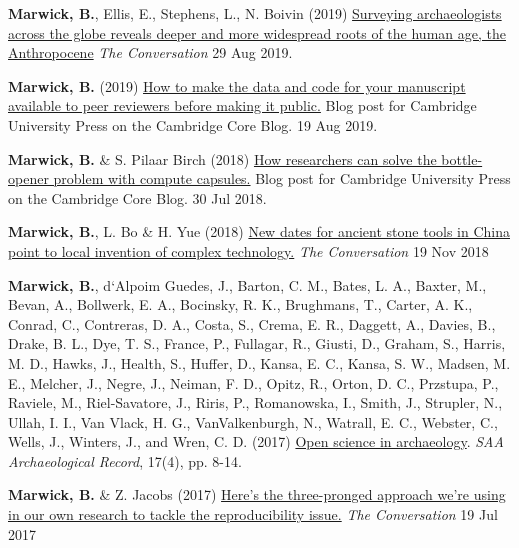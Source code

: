 \documentclass[11pt,article,oneside]{memoir}
\begin{document}
{{{\ind \textbf{Marwick, B.}, Ellis, E., Stephens, L., N. Boivin (2019) \href{https://theconversation.com/surveying-archaeologists-across-the-globe-reveals-deeper-and-more-widespread-roots-of-the-human-age-the-anthropocene-122008}{Surveying archaeologists across the globe reveals deeper and more widespread roots of the human age, the Anthropocene} \textit{The Conversation} 29 Aug 2019.

\ind \textbf{Marwick, B.} (2019) \href{https://www.cambridge.org/core/blog/2019/08/19/how-to-make-the-data-and-code-for-your-manuscript-available-to-peer-reviewers-before-making-it-public/}{How to make the data and code for your manuscript available to peer reviewers before making it public.} Blog post for Cambridge University Press on the Cambridge Core Blog. 19 Aug 2019.

\ind \textbf{Marwick, B.} \& S. Pilaar Birch (2018) \href{https://www.cambridge.org/core/blog/2018/07/30/how-researchers-can-solve-the-bottle-opener-problem-with-compute-capsules/}{How researchers can solve the bottle-opener problem with compute capsules.} Blog post for Cambridge University Press on the Cambridge Core Blog. 30 Jul 2018. 

\ind \textbf{Marwick, B.}, L. Bo \& H. Yue (2018) \href{https://theconversation.com/new-dates-for-ancient-stone-tools-in-china-point-to-local-invention-of-complex-technology-106914}{New dates for ancient stone tools in China point to local invention of complex technology.} \textit{The Conversation} 19 Nov 2018 

\ind \textbf{Marwick, B.}, d`Alpoim Guedes, J., Barton, C. M., Bates, L. A., Baxter, M., Bevan, A., Bollwerk, E. A., Bocinsky, R. K., Brughmans, T., Carter, A. K., Conrad, C., Contreras, D. A., Costa, S., Crema, E. R., Daggett, A., Davies, B., Drake, B. L., Dye, T. S., France, P., Fullagar, R., Giusti, D., Graham, S., Harris, M. D., Hawks, J., Health, S., Huffer, D., Kansa, E. C., Kansa, S. W., Madsen, M. E., Melcher, J., Negre, J., Neiman, F. D., Opitz, R., Orton, D. C., Przstupa, P., Raviele, M., Riel-Savatore, J., Riris, P., Romanowska, I., Smith, J., Strupler, N., Ullah, I. I., Van Vlack, H. G., VanValkenburgh, N., Watrall, E. C., Webster, C., Wells, J., Winters, J., and Wren, C. D. (2017) \href{http://www.saa.org/Portals/0/SAA\_Record\_Sept\_2017\_Final\_LR.pdf\#page\=10}{Open science in archaeology}. \textit{SAA Archaeological Record}, 17(4), pp. 8-14. 

\ind \textbf{Marwick, B.} \& Z. Jacobs (2017) \href{https://theconversation.com/heres-the-three-pronged-approach-were-using-in-our-own-research-to-tackle-the-reproducibility-issue-80997}{Here’s the three-pronged approach we’re using in our own research to tackle the reproducibility issue.} \textit{The Conversation} 19 Jul 2017 

}}}
\end{document}
